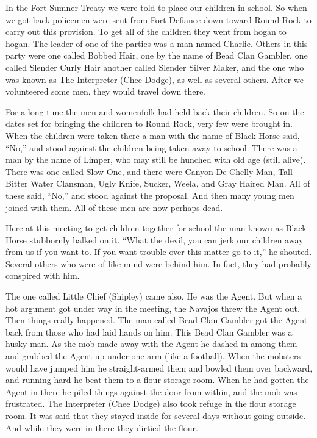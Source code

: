 In the Fort Sumner Treaty we were told to place our children in school. So when we got back policemen were sent from Fort Defiance down toward Round Rock to carry out this provision. To get all of the children they went from hogan to hogan. The leader of one of the parties was a man named Charlie. Others in this party were one called Bobbed Hair, one by the name of Bead Clan Gambler, one called Slender Curly Hair another called Slender Silver Maker, and the one who was known as The Interpreter (Chee Dodge), as well as several others. After we volunteered some men, they would travel down there.

For a long time the men and womenfolk had held back their children. So on the dates set for bringing the children to Round Rock, very few were brought in. When the children were taken there a man with the name of Black Horse said, ``No,'' and stood against the children being taken away to school. There was a man by the name of Limper, who may still be hunched with old age (still alive). There was one called Slow One, and there were Canyon De Chelly Man, Tall Bitter Water Clansman, Ugly Knife, Sucker, Weela, and Gray Haired Man. All of these said, ``No,'' and stood against the proposal. And then many young men joined with them. All of these men are now perhaps dead.

Here at this meeting to get children together for school the man known as Black Horse stubbornly balked on it. ``What the devil, you can jerk our children away from us if you want to. If you want trouble over this matter go to it,'' he shouted. Several others who were of like mind were behind him. In fact, they had probably conspired with him.

The one called Little Chief (Shipley) came also. He was the Agent. But when a hot argument got under way in the meeting, the Navajos threw the Agent out. Then things really happened. The man called Bead Clan Gambler got the Agent back from those who had laid hands on him. This Bead Clan Gambler was a husky man. As the mob made away with the Agent he dashed in among them and grabbed the Agent up under one arm (like a football). When the mobsters would have jumped him he straight-armed them and bowled them over backward, and running hard he beat them to a flour storage room. When he had gotten the Agent in there he piled things against the door from within, and the mob was frustrated. The Interpreter (Chee Dodge) also took refuge in the flour storage room. It was said that they stayed inside for several days without going outside. And while they were in there they dirtied the flour.

